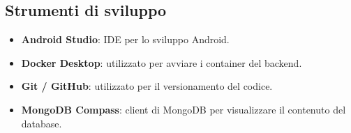 \subsection{Strumenti di sviluppo}

\begin{itemize}[label={--}, leftmargin=1.2cm]
    \item \textbf{Android Studio}: IDE per lo sviluppo Android.

    \item \textbf{Docker Desktop}: utilizzato per avviare i container del backend.

    \item \textbf{Git / GitHub}: utilizzato per il versionamento del codice.

    \item \textbf{MongoDB Compass}: client di MongoDB per visualizzare il contenuto del database.
\end{itemize}
